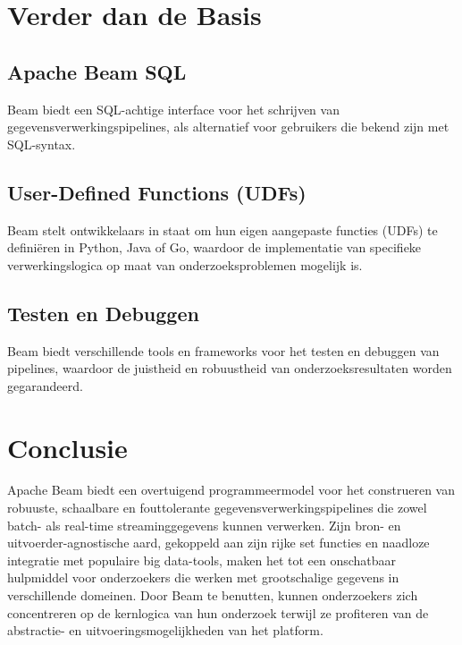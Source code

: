 \section{Verder dan de Basis}

\subsection{Apache Beam SQL}
Beam biedt een SQL-achtige interface voor het schrijven van gegevensverwerkingspipelines, als alternatief voor gebruikers die bekend zijn met SQL-syntax.

\subsection{User-Defined Functions (UDFs)}
Beam stelt ontwikkelaars in staat om hun eigen aangepaste functies (UDFs) te definiëren in Python, Java of Go, waardoor de implementatie van specifieke verwerkingslogica op maat van onderzoeksproblemen mogelijk is.

\subsection{Testen en Debuggen}
Beam biedt verschillende tools en frameworks voor het testen en debuggen van pipelines, waardoor de juistheid en robuustheid van onderzoeksresultaten worden gegarandeerd.

\section{Conclusie}

Apache Beam biedt een overtuigend programmeermodel voor het construeren van robuuste, schaalbare en fouttolerante gegevensverwerkingspipelines die zowel batch- als real-time streaminggegevens kunnen verwerken. Zijn bron- en uitvoerder-agnostische aard, gekoppeld aan zijn rijke set functies en naadloze integratie met populaire big data-tools, maken het tot een onschatbaar hulpmiddel voor onderzoekers die werken met grootschalige gegevens in verschillende domeinen. Door Beam te benutten, kunnen onderzoekers zich concentreren op de kernlogica van hun onderzoek terwijl ze profiteren van de abstractie- en uitvoeringsmogelijkheden van het platform.

